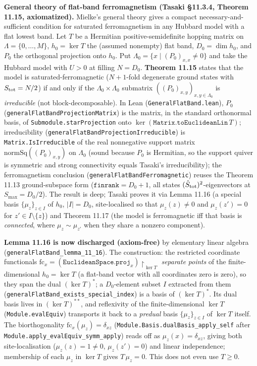 \documentclass[a4paper,11pt]{article}
\begin{document}
\medskip\noindent\textbf{General theory of flat-band ferromagnetism (Tasaki §11.3.4,
Theorem 11.15, axiomatized).}  Mielke's general theory gives a compact necessary-and-%
sufficient condition for saturated ferromagnetism in any Hubbard model with a flat lowest
band.  Let $T$ be a Hermitian positive-semidefinite hopping matrix on $\Lambda=\{0,\dots,M\}$,
$h_0=\ker T$ the (assumed nonempty) flat band, $D_0=\dim h_0$, and $P_0$ the orthogonal
projection onto $h_0$.  Put $\Lambda_0=\{x\mid (P_0)_{x,x}\ne0\}$ and take the Hubbard model
with $U>0$ at filling $N=D_0$.  \textbf{Theorem 11.15} states that the model is
saturated-ferromagnetic ($N{+}1$-fold degenerate ground states with $S_{\rm tot}=N/2$) if and
only if the $\Lambda_0\times\Lambda_0$ submatrix $((P_0)_{x,y})_{x,y\in\Lambda_0}$ is
\emph{irreducible} (not block-decomposable).  In Lean (\texttt{GeneralFlatBand.lean}),
$P_0$ (\texttt{generalFlatBandProjectionMatrix}) is the matrix, in the standard orthonormal
basis, of \texttt{Submodule.starProjection} onto $\ker(\texttt{Matrix.toEuclideanLin}\,T)$;
irreducibility (\texttt{generalFlatBandProjectionIrreducible}) is \texttt{Matrix.IsIrreducible}
of the real nonnegative support matrix $\mathrm{normSq}((P_0)_{x,y})$ on $\Lambda_0$ (sound
because $P_0$ is Hermitian, so the support quiver is symmetric and strong connectivity equals
Tasaki's irreducibility); the ferromagnetism conclusion
(\texttt{generalFlatBandFerromagnetic}) reuses the Theorem 11.13 ground-subspace form
($\texttt{finrank}=D_0{+}1$, all states $(\hat S_{\rm tot})^2$-eigenvectors at $S_{\max}=D_0/2$).
The result is deep; Tasaki proves it via Lemma 11.16 (a special basis $\{\mu_z\}_{z\in I}$ of
$h_0$, $|I|=D_0$, site-localised so that $\mu_z(z)\ne0$ and $\mu_z(z')=0$ for $z'\in I\setminus\{z\}$)
and Theorem 11.17 (the model is ferromagnetic iff that basis is \emph{connected}, where
$\mu_z\sim\mu_{z'}$ when they share a nonzero component).

\textbf{Lemma 11.16 is now discharged (axiom-free)} by elementary linear algebra
(\texttt{generalFlatBand\_lemma\_11\_16}).  The construction: the restricted coordinate
functionals $\mathrm{fc}_x = (\texttt{EuclideanSpace.proj}_x)\!\restriction_{\ker T}$
\emph{separate points} of the finite-dimensional $h_0=\ker T$ (a flat-band vector with all
coordinates zero is zero), so they span the dual $(\ker T)^\ast$; a $D_0$-element subset $I$
extracted from them (\texttt{generalFlatBand\_exists\_special\_index}) is a basis of
$(\ker T)^\ast$.  Its dual basis lives in $(\ker T)^{\ast\ast}$, and reflexivity of the
finite-dimensional $\ker T$ (\texttt{Module.evalEquiv}) transports it back to a
\emph{predual} basis $\{\mu_z\}_{z\in I}$ of $\ker T$ itself.  The biorthogonality
$\mathrm{fc}_x(\mu_z)=\delta_{xz}$ (\texttt{Module.Basis.dualBasis\_apply\_self} after
\texttt{Module.apply\_evalEquiv\_symm\_apply}) reads off as $\mu_z(x)=\delta_{xz}$, giving both
site-localisation ($\mu_z(z)=1\ne0$, $\mu_z(z')=0$) and linear independence; membership of each
$\mu_z$ in $\ker T$ gives $T\,\mu_z=0$.  This does not even use $T\ge0$.
\end{document}
